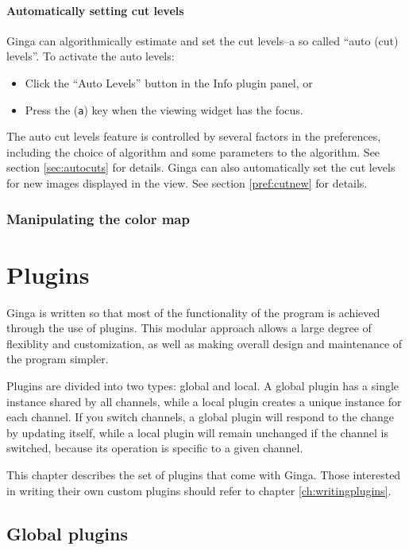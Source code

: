 \documentclass[11pt]{report}
\begin{document}
\subsubsection{Automatically setting cut levels}
Ginga can algorithmically estimate and set the cut levels--a so called
``auto (cut) levels''.  To activate the auto levels:
\begin{itemize}
\item Click the ``Auto Levels'' button in the Info plugin panel, or
\item Press the ({\tt a}) key when the viewing widget has the focus.
\end{itemize}

The auto cut levels feature is controlled by several factors in the
preferences, including the choice of algorithm and some parameters to
the algorithm.  See section \ref{sec:autocuts} for details.
Ginga can also automatically set the cut levels for new images displayed
in the view.  See section \ref{pref:cutnew} for details.

\subsection{Manipulating the color map}


\chapter{Plugins}
\label{ch:plugins}
Ginga is written so that most of the functionality of the program is
achieved through the use of plugins.  This modular approach allows a
large degree of flexiblity and customization, as well as making overall
design and maintenance of the program simpler.

Plugins are divided into two types: global and local.  A global plugin
has a single instance shared by all channels, while a local plugin
creates a unique instance for each channel.  If you switch channels, a
global plugin will respond to the change by updating itself,
while a local plugin will remain unchanged if the channel is switched,
because its operation is specific to a given channel.

This chapter describes the set of plugins that come with Ginga.  Those
interested in writing their own custom plugins should refer to chapter
\ref{ch:writingplugins}. 

\section{Global plugins}
\end{document}

